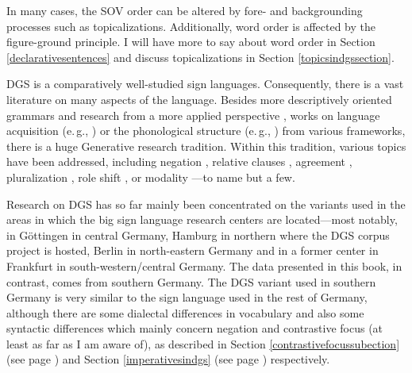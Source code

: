 \begin{exe}
\ex \label{ex:basciclausstructure}
\end{exe}


\noindent In many cases, the SOV order can be altered by fore- and backgrounding processes such as topicalizations. Additionally, word order is affected by the figure-ground principle. I will have more to say about word order in Section \ref{declarativesentences} and discuss topicalizations in Section \ref{topicsindgssection}. 

DGS is a comparatively well-studied sign languages. Consequently, there is a vast literature on many aspects of the language. Besides more descriptively oriented grammars \citep{papaspyrou2008grammatik,happ2014vork} and research from a more applied perspective \citep{eichmannhansenhessmann2012,dumig2013}, works on language acquisition (e.\,g., \citealt{leuninger1997lena,hanel2005spracherwerb,haenelfaul2012erwerb}) or the phonological structure (e.\,g., \citealt{benner2012,herrmann2012prosody,dumig2013}) from various frameworks, there is a huge Generative research tradition. Within this tradition, various topics have been addressed, including negation \citep{pfau2008headshake,pfau2016featural}, relative clauses \citep{pfau2005relative}, agreement \citep{pfau2006thedevelopment,steinbach2007grammaticalization,steinbach2011agreement,pfausalzmannsteinbach2018agreement}, pluralization \citep{pfausteinbach2004}, role shift \citep{hermannsteinbach2012quotation}, or modality \citep{herrmann2007,herrmann2013modal}---to name but a few.

Research on DGS has so far mainly been concentrated on the variants used in the areas in which the big sign language research centers are located---most notably, in G\"ottingen in central Germany, Hamburg in northern where the DGS corpus project \citep{jahn2018} is hosted, Berlin in north-eastern Germany and in a former center in Frankfurt in south-western/central Germany. The data presented in this book, in contrast, comes from southern Germany. The DGS variant used in southern Germany is very similar to the sign language used in the rest of Germany, although there are some dialectal differences in vocabulary and also some syntactic differences which mainly concern negation and contrastive focus (at least as far as I am aware of), as described in Section \ref{contrastivefocussubection} (see page \pageref{contrastivefocus}) and Section \ref{imperativesindgs} (see page \pageref{negationnegaation}) respectively. 

